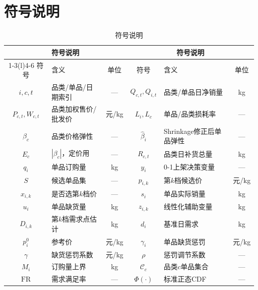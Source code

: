 \section{符号说明}
\begin{table}[H]
\centering
\small
\setlength{\tabcolsep}{3pt}
\caption{符号说明}
\label{tab:符号说明}
\begin{tabularx}{\textwidth}{c X c c X c}
\toprule
\multicolumn{3}{c}{\bfseries 符号说明} & \multicolumn{3}{c}{\bfseries 符号说明} \\
\cmidrule(r){1-3}\cmidrule(l){4-6}
符号 & 含义 & 单位 & 符号 & 含义 & 单位 \\
\midrule
$i,c,t$ & 品类/单品/日期索引 & --- & $Q_{c,t},Q_{i,t}$ & 品类/单品日净销量 & kg \\
$P_{c,t},W_{c,t}$ & 品类加权售价/批发价 & 元/kg & $L_i,L_c$ & 单品/品类损耗率 & --- \\
$\beta_c$ & 品类价格弹性 & --- & $\hat\beta_i$ & Shrinkage修正后单品弹性 & --- \\
$E_c$ & $|\beta_c|$，定价用 & --- & $R_{c,t}$ & 品类日补货总量 & kg \\
$q_i$ & 单品订购量 & kg & $y_i$ & 0-1上架决策变量 & --- \\
$S$ & 候选单品集 & --- & $p_{i,k}$ & 第$k$档候选价 & 元/kg \\
$x_{i,k}$ & 是否选第$k$档价 & --- & $s_i$ & 单品实际销量 & kg \\
$u_i$ & 单品缺货量 & kg & $z_{i,k}$ & 线性化辅助变量 & kg \\
$D_{i,k}$ & 第$k$档需求点估计 & kg & $d_i$ & 基准日需求 & kg \\
$p_i^0$ & 参考价 & 元/kg & $\gamma_i$ & 单品缺货惩罚 & 元/kg \\
$\gamma$ & 缺货惩罚系数 & 元/kg & $\rho$ & 惩罚调节系数 & --- \\
$M_i$ & 订购量上界 & kg & $\mathcal{C}_c$ & 品类$c$单品集合 & --- \\
$\mathrm{FR}$ & 需求满足率 & --- & $\Phi(\cdot)$ & 标准正态CDF & --- \\
\bottomrule
\end{tabularx}
\end{table}
